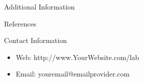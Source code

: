 \documentclass[final]{beamer}
\newlength{\onecolwid}
\begin{document}
\begin{frame}[t]
\begin{columns}[t]
\begin{column}{\onecolwid}
\begin{block}{Additional Information}
\end{block}


\begin{block}{References}

\nocite{*} %
\small{
\vspace{0.75in}}

\end{block}








\begin{alertblock}{Contact Information}

\begin{itemize}
\item Web: http://www.YourWebsite.com/lab
\item Email: youremail@emailprovider.com
\end{itemize}

\end{alertblock}


\end{column} %

\end{columns} %

\end{frame} %
\end{document}
